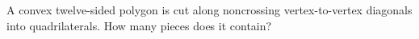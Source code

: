 A convex twelve-sided polygon is cut along noncrossing vertex-to-vertex diagonals into quadrilaterals. How many pieces does it contain?
